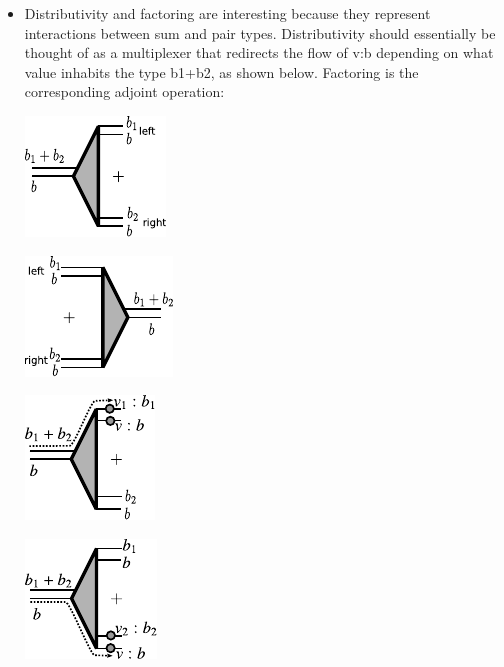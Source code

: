 \documentclass{llncs}
\begin{document}
\begin{itemize}
\item Distributivity and factoring are interesting because they
  represent interactions between sum and pair types. Distributivity
  should essentially be thought of as a multiplexer that redirects the
  flow of {{v:b}} depending on what value inhabits the type {{b1+b2}},
  as shown below. Factoring is the corresponding adjoint operation:

\begin{multicols}{4}
\begin{center}
  \includegraphics{diagrams/thesis/dist.pdf}
\end{center}
\begin{center}
  \includegraphics{diagrams/thesis/factor.pdf}
\end{center}
\begin{center}
  \includegraphics{diagrams/thesis/dist-wire-value1.pdf}
\end{center}
\begin{center}
  \includegraphics{diagrams/thesis/dist-wire-value2.pdf}
\end{center}
\end{multicols}


\end{itemize}
\end{document}
